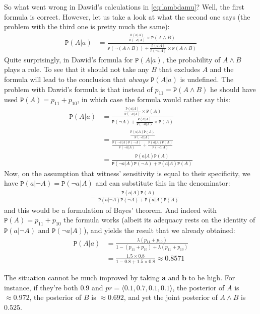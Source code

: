 \documentclass{ifcolog}
\newcommand{\pr}[1]{\mbox{$\mathtt{P}(#1)$}}
\newcommand{\n}{\neg}
\newcommand{\et}{\wedge}
\newcommand{\la}{\langle}
\newcommand{\ra}{\rangle}
\begin{document}
So what went wrong in Dawid's calculations in \eqref{eq:lambdamu}? Well, the first formula is correct. However, let us take a look at what the second one says (the problem with the third one is pretty much the same):
\begin{align*}
\pr{A\vert a } & = \frac{\frac{\pr{a\vert A}}{\pr{\n a \vert A}}\times \pr{A\et B}}{\pr{\n (A\et B)}+ \frac{\pr{a\vert A}}{\pr{\n a \vert A}} \times \pr{A\et B}}
\end{align*}
Quite surprisingly, in Dawid's formula for $\pr{A\vert a}$, the probability of $A\et B$ plays a role. To see that it should not take any $B$ that excludes $A$ and the formula will lead to the conclusion that \emph{always} $\pr{A\vert a}$ is undefined. The problem with Dawid's formula is that instead of $p_{11}=\pr{A\et B}$ he should have used $\pr{A}=p_{11}+p_{10}$, in which case the formula would rather say this:
\begin{align*}
\pr{A\vert a } & = \frac{\frac{\pr{a\vert A}}{\pr{\n a \vert A}}\times \pr{A}}{\pr{\n A}+ \frac{\pr{a\vert A}}{\pr{\n a \vert A}} \times \pr{A}}\\
& = \frac{\frac{\pr{a\vert A}\pr{A}}{\pr{\n a \vert A}}}{\frac{\pr{\n a\vert A}\pr{\n A}}{\pr{\n a\vert A}}+ \frac{\pr{a\vert A}\pr{A}}{\pr{\n a \vert A}}}\\
& = \frac{\pr{a\vert A}\pr{A}}{\pr{\n a\vert A}\pr{\n A} + \pr{a\vert A}\pr{A}}
\end{align*}
Now, on the assumption that witness' sensitivity is equal to their specificity, we have $\pr{a\vert \n A}=\pr{\n a \vert A}$ and can substitute this in the denominator:
 \begin{align*} & = \frac{\pr{a\vert A}\pr{A}}{\pr{ a\vert \n A}\pr{\n A} + \pr{a\vert A}\pr{A}}\end{align*}
and this would be a formulation of Bayes' theorem.  And indeed with $\pr{A}=p_{11}+p_{10}$ the formula works (albeit its adequacy rests on the identity of $\pr{a\vert \n A}$ and $\pr{\n a \vert A}$), and yields the result that we already obtained:
\begin{align*}
\pr{A\vert a} &= \frac{\lambda(p_{11}+p_{10})}{1-(p_{11}+p_{10})+\lambda(p_{11}+p_{10})}\\
&= \frac{1.5\times 0.8}{1- 0.8+1.5\times 0.8} \approx 0.8571
\end{align*}



  The situation cannot be much improved by taking $\mathbf{a}$ and $\mathbf{b}$ to be high. For instance, if they're both 0.9 and $pr=\la0.1, 0.7, 0.1, 0.1 \ra$, the posterior of $A$ is $\approx 0.972$, the posterior of $B$ is $\approx 0.692$, and yet the joint posterior of $A\et B$ is $0.525$.
\end{document}
